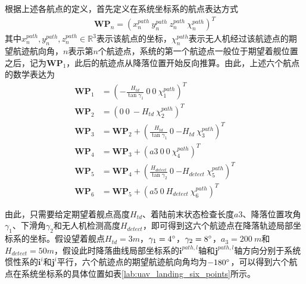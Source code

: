 根据上述各航点的定义，首先定义在系统坐标系的航点表达方式
\begin{align}
\mathbf{WP}_n = (x_n^{path}\ y_n^{path} \ z_n^{path}\ \chi_n^{path})^T
\end{align}
其中$x_n^{path}, y_n^{path}, z_n^{path} \in \mathbb{R}^3$表示该航点的坐标，$\chi_n^{path}$表示无人机经过该航迹点的期望航迹航向角，$n$表示第$n$个航迹点，系统的第一个航迹点一般位于期望着舰位置之后，记为$\mathbf{WP}_1$，此后的航迹点从降落位置开始反向推算。由此，上述六个航点的数学表达为
\begin{align}
\mathbf{WP}_1 &= (-\frac{H_{td}}{\tan{\gamma_1}}\ 0 \ 0\ \chi_1^{path})^T \\
\mathbf{WP}_2 &= (0\ 0 \ -H_{td}\ \chi_2^{path})^T \\
\mathbf{WP}_3 &= \mathbf{WP}_2 + (\frac{H_{td}}{\tan{\gamma_1}}\ 0 \ {-H_{td}}\ \chi_3^{path})^T\\
\mathbf{WP}_4 &= \mathbf{WP}_3+ (a3 \ 0 \ 0\ \chi_4^{path})^T \\
\mathbf{WP}_5 &= \mathbf{WP}_4 + (\frac{H_{detect}}{\tan{\gamma_2}}\ 0 \ {-H_{detect}}\ \chi_5^{path})^T \\
\mathbf{WP}_6 &= \mathbf{WP}_5 + (a5\ 0 \ H_{detect}\ \chi_6^{path})^T 
\end{align}

由此，只需要给定期望着舰点高度$H_{td}$、着陆前末状态检查长度$a3$、降落位置攻角$\gamma_1$、下滑角$\gamma_2$和无人机检测高度$H_{detect}$，即可得到这六个航迹点在降落轨迹局部坐标系的坐标。假设望着舰点$H_{td} = 3 m$，$\gamma_1=4 \degree$，$\gamma_2=8\degree$，$a_3 = 200\ m$和$H_{detect} = 50 m$，假设此时降落曲线局部坐标系的$\mathbf{i}^{path,l}$轴和$\mathbf{j}^{path,l}$轴方向分别于系统惯性系的$\mathbf{i}^{i}$和$\mathbf{j}^i$平行，六个航迹点的期望航迹航向角均为$-180\degree$，可以得到六个航点在系统坐标系的具体位置如表\ref{lab:uav_landing_six_points}所示。

